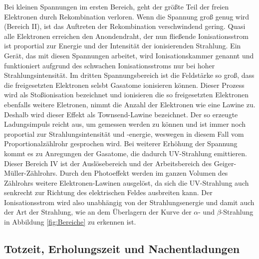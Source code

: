 Bei kleinen Spannungen im ersten Bereich, geht der größte Teil der freien Elektronen durch Rekombination verloren.
Wenn die Spannung groß genug wird (Bereich \RN{2}), ist das Auftreten der Rekombination verschwindend gering.
Quasi alle Elektronen erreichen den Anondendraht, der nun fließende Ionisationsstrom ist proportial zur Energie und der Intensität der ionisierenden Strahlung.
Ein Gerät, das mit diesen Spannungen arbeitet, wird Ionisationskammer genannt und funktioniert aufgrund des schwachen Ionisationsstroms nur bei hoher Strahlungsintensität.
Im dritten Spannungsbereich ist die Feldstärke so groß, dass die freigesetzten Elektronen selsbt Gasatome ionisieren können.
Dieser Prozess wird als Stoßionisation bezeichnet und ionisieren die so freigesetzten Elektronen ebenfalls weitere Eletronen, nimmt die Anzahl der Elektronen wie eine Lawine zu.
Deshalb wird dieser Effekt als Townsend-Lawine bezeichnet.
Der so erzeugte Ladungsimpuls reicht aus, um gemessen werden zu können und ist immer noch proportial zur Strahlungsintensität und -energie, weswegen in diesem Fall vom Proportionalzählrohr gesprochen wird.
Bei weiterer Erhöhung der Spannung kommt es zu Anregungen der Gasatome, die dadurch UV-Strahlung emittieren.
Dieser Bereich \RN{4} ist der Auslösebereich und der Arbeitsbereich des Geiger-Müller-Zählrohrs.
Durch den Photoeffekt werden im ganzen Volumen des Zählrohrs weitere Elektronen-Lawinen ausgelöst, da sich die UV-Strahlung auch senkrecht zur Richtung des elektrischen Feldes ausbreiten kann.
Der Ionisationsstrom wird also unabhängig von der Strahlungsenergie und damit auch der Art der Strahlung, wie an dem Überlagern der Kurve der $\alpha$- und $\beta$-Strahlung in Abbildung \ref{fig:Bereiche} zu erkennen ist. \cite{V703}

\subsection{Totzeit, Erholungszeit und Nachentladungen}

